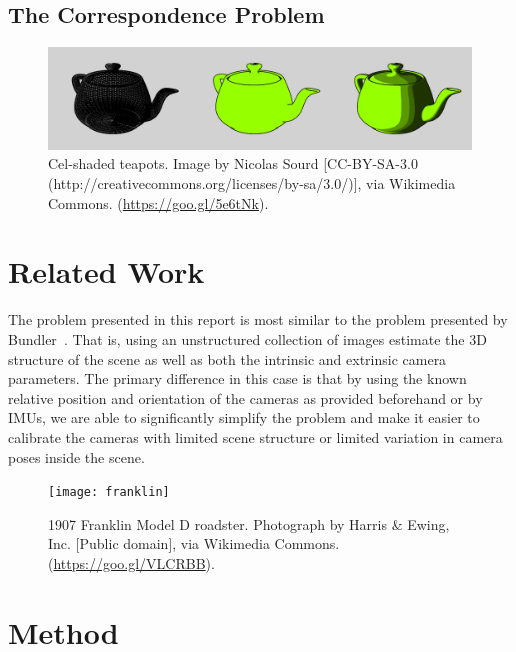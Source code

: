 \documentclass[preprint,acmtog]{acmart}
\begin{document}
\subsection{The Correspondence Problem}




\begin{figure}[ht]
  \centering
  \includegraphics[width=\linewidth]{teapots}
  \caption{Cel-shaded teapots. Image by Nicolas Sourd [CC-BY-SA-3.0 (http://creativecommons.org/licenses/by-sa/3.0/)], via Wikimedia Commons. (\url{https://goo.gl/5e6tNk}).}
\end{figure}


\section{Related Work}


The problem presented in this report is most similar to the problem presented by
Bundler~\cite{bundler2006}. That is, using an unstructured collection of images
estimate the 3D structure of the scene as well as both the intrinsic and
extrinsic camera parameters. The primary difference in this case is that by
using the known relative position and orientation of the cameras as provided
beforehand or by IMUs, we are able to significantly simplify the problem and
make it easier to calibrate the cameras with limited scene structure or limited
variation in camera poses inside the scene.



\begin{figure}[h]
  \centering
  \texttt{[image: franklin]}
  \caption{1907 Franklin Model D roadster. Photograph by Harris \& Ewing, Inc. [Public domain], via Wikimedia Commons. (\url{https://goo.gl/VLCRBB}).}
\end{figure}



\section{Method}
\end{document}

